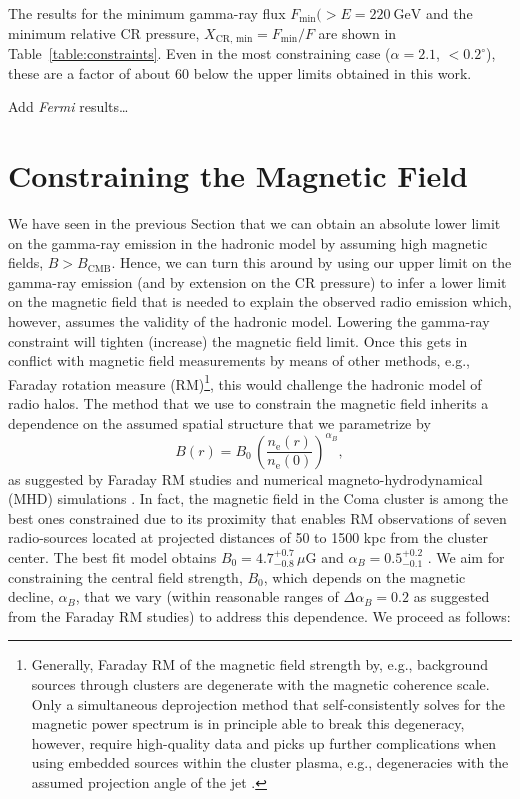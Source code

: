 \documentclass[12pt,manuscript]{aastex}
\newcommand{\rmn}{\mathrm}
\newcommand{\CR}{\mathrm{CR}}
\begin{document}
The results for the minimum gamma-ray flux $F_{\rmn{min}}(>E=220~\rmn{GeV}$ and
the minimum relative CR pressure, $X_{\CR,\,\rmn{min}} = F_{\rmn{min}}/F$ are
shown in Table~\ref{table:constraints}. Even in the most constraining case
($\alpha=2.1$, $<0.2^\circ$), these are a factor of about 60 below the upper
limits obtained in this work. 

Add {\em Fermi} results\ldots



\section{Constraining the Magnetic Field}
\label{sec:B}


We have seen in the previous Section that we can obtain an absolute lower limit
on the gamma-ray emission in the hadronic model by assuming high magnetic
fields, $B>B_\rmn{CMB}$. Hence, we can turn this around by using our upper limit
on the gamma-ray emission (and by extension on the CR pressure) to infer a lower
limit on the magnetic field that is needed to explain the observed radio
emission which, however, assumes the validity of the hadronic model. Lowering
the gamma-ray constraint will tighten (increase) the magnetic field limit. Once
this gets in conflict with magnetic field measurements by means of other
methods, e.g., Faraday rotation measure (RM)\footnote{Generally, Faraday RM
  of the magnetic field strength by, e.g., background sources through clusters
  are degenerate with the magnetic coherence scale. Only a simultaneous
  deprojection method that self-consistently solves for the magnetic power
  spectrum is in principle able to break this degeneracy, however, require
  high-quality data and picks up further complications when using embedded
  sources within the cluster plasma, e.g., degeneracies with the assumed
  projection angle of the jet \citep{2011A&A...529A..13K}.}, this would
challenge the hadronic model of radio halos.  The method that we use to
constrain the magnetic field inherits a dependence on the assumed spatial
structure that we parametrize by
\begin{equation}
  \label{eq:B}
  B(r) = B_0  \,\left(\frac{n_\rmn{e}(r)}{n_\rmn{e}(0)}\right)^{\alpha_B},
\end{equation}
as suggested by Faraday RM studies and numerical magneto-hydrodynamical (MHD)
simulations \citep[][and references therein]{2010A&A...513A..30B,
  2011arXiv1107.0968B}. In fact, the magnetic field in the Coma cluster is among
the best ones constrained due to its proximity that enables RM observations of
seven radio-sources located at projected distances of 50 to 1500 kpc from the
cluster center. The best fit model obtains $B_0 = 4.7^{+0.7}_{-0.8}\,\mu$G and
$\alpha_B = 0.5^{+0.2}_{-0.1}$ \citep{2010A&A...513A..30B}.  We aim for
constraining the central field strength, $B_0$, which depends on the magnetic
decline, $\alpha_B$, that we vary (within reasonable ranges of
$\Delta\alpha_B=0.2$ as suggested from the Faraday RM studies) to address this
dependence. We proceed as follows:
\end{document}
